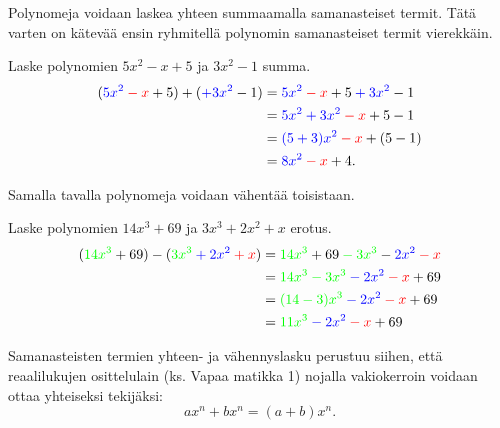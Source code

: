 
Polynomeja voidaan laskea yhteen summaamalla samanasteiset termit. Tätä varten on kätevää ensin ryhmitellä polynomin samanasteiset termit vierekkäin.

\begin{esimerkki}
Laske polynomien $5x^2-x+5$ ja $3x^2-1$ summa.
   \begin{align*}
        (\textcolor{blue}{5x^2} \textcolor{red}{{}-x} + 5) + (\textcolor{blue}{+3x^2} -1) 
        &=\textcolor{blue}{5x^2} \textcolor{red}{{}-x} + 5  \textcolor{blue}{{}+3x^2} -1 \\
        &=\textcolor{blue}{5x^2+3x^2} \textcolor{red}{{}-x} +5-1\\
        &=\textcolor{blue}{(5+3)x^2} \textcolor{red}{{}-x}+(5-1)\\
        &=\textcolor{blue}{8x^2} \textcolor{red}{{}-x}+4.
    \end{align*}
\end{esimerkki}

Samalla tavalla polynomeja voidaan vähentää toisistaan.

\begin{esimerkki}
    Laske polynomien $14x^3+69$ ja $3x^3+2x^2+x$ erotus.
    \begin{align*}
        (\textcolor{green}{14x^3} + 69) - (\textcolor{green}{3x^3} \textcolor{blue}{{}+ 2x^2} \textcolor{red}{{}+x})
        &= \textcolor{green}{14x^3} + 69 \textcolor{green}{{}-3x^3} - 
            \textcolor{blue}{2x^2} \textcolor{red}{{}-x} \\
        &= \textcolor{green}{14x^3{}-3x^3} \textcolor{blue}{{}-2x^2} \textcolor{red}{{}-x} + 69 \\
        &= \textcolor{green}{(14{}-3)x^3} \textcolor{blue}{{}-2x^2} \textcolor{red}{{}-x} + 69 \\
        &= \textcolor{green}{11x^3} \textcolor{blue}{{}-2x^2} \textcolor{red}{{}-x} + 69
    \end{align*}
\end{esimerkki}
    
Samanasteisten termien yhteen- ja vähennyslasku perustuu siihen, että reaalilukujen osittelulain (ks. Vapaa matikka 1) nojalla vakiokerroin voidaan
ottaa yhteiseksi tekijäksi:
\[
ax^n+bx^n=(a+b)x^n.
\]
    
